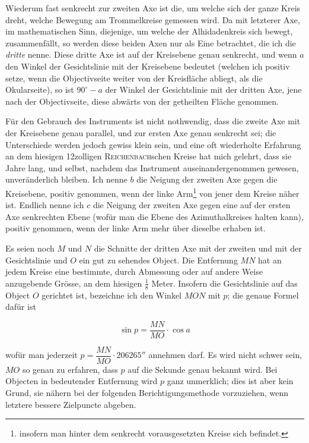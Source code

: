 \par\indent Wiederum fast senkrecht zur zweiten Axe ist die, um welche sich der ganze Kreis dreht, welche Bewegung am Trommelkreise gemessen wird. Da mit letzterer Axe, im mathematischen Sinn, diejenige,  um welche der Alhidadenkreis sich bewegt, zusammenfällt, so werden diese beiden Axen nur als Eine betrachtet, die ich die \emph{dritte} nenne. Diese dritte Axe ist auf der Kreisebene genau senkrecht, und wenn $a$ den Winkel der Gesichtslinie mit der Kreisebene bedeutet (welchen ich positiv setze, wenn die Objectivseite weiter von der Kreisfläche abliegt, als die Okularseite), so ist $90^\circ{-}a$ der Winkel der Gesichtslinie mit der dritten Axe, jene nach der Objectivseite, diese abwärts von der getheilten Fläche genommen.

\par\indent Für den Gebrauch des Instruments ist nicht nothwendig, dass die zweite Axe mit der Kreisebene genau parallel, und zur ersten Axe genau senkrecht sei; die Unterschiede werden jedoch gewiss klein sein, und eine oft wiederholte Erfahrung an dem hiesigen 12zolligen \textsc{Reichenbach}schen Kreise hat mich gelehrt, dass sie Jahre lang, und selbst, nachdem das Instrument auseinandergenommen gewesen, unveränderlich bleiben. Ich nenne $b$ die Neigung der zweiten Axe gegen die Kreisebene, positiv genommen, wenn der linke Arm\footnote{insofern man hinter dem senkrecht vorausgesetzten Kreise sich befindet.} von jener dem Kreise näher ist. Endlich nenne ich $c$ die Neigung der zweiten Axe gegen eine auf der ersten Axe senkrechten Ebene (wofür man die Ebene des Azimuthalkreises halten kann), positiv genommen, wenn der linke Arm mehr über dieselbe erhaben ist.

\par\indent Es seien noch $M$ und $N$ die Schnitte der dritten Axe mit der zweiten und mit der Gesichtslinie und $O$ ein gut zu sehendes Object. Die Entfernung $MN$ hat an jedem Kreise eine bestimmte, durch Abmessung oder auf andere Weise anzugebende Grösse, an dem hiesigen $\frac{1}{8}$ Meter. Insofern die Gesichtslinie auf das Object $O$ gerichtet ist, bezeichne ich den Winkel $MON$ mit $p$; die genaue Formel dafür ist

\[ \sin p = \frac{MN}{MO}\cdot\cos a \]

\noindent wofür man jederzeit $p = \dfrac{MN}{MO}\cdot 206265''$ annehmen darf. Es wird nicht schwer sein, $MO$ so genau zu erfahren, dass $p$ auf die Sekunde genau bekannt wird. Bei Objecten in bedeutender Entfernung wird $p$ ganz unmerklich; dies ist aber kein Grund, sie nähern bei der folgenden Berichtigungsmethode vorzuziehen, wenn letztere bessere Zielpuncte abgeben.

